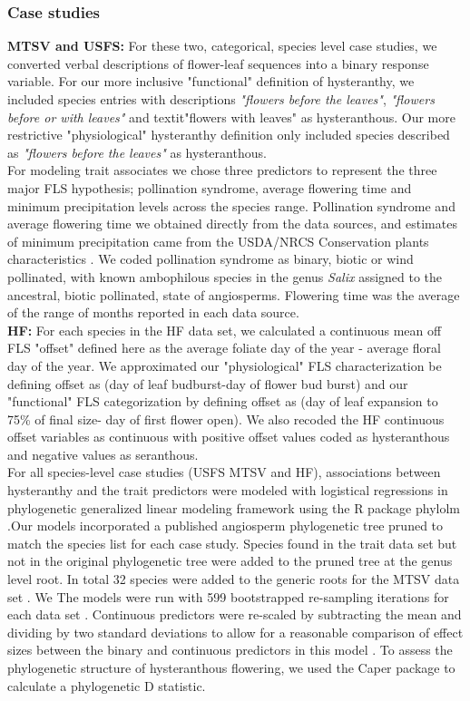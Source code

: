 \documentclass[12pt]{article}\usepackage[]{graphicx}\usepackage[]{color}
\begin{document}
\subsubsection*{Case studies}
\indent\indent \textbf{MTSV and USFS:} For these two, categorical, species level case studies, we converted verbal descriptions of flower-leaf sequences into a binary response variable. For our more inclusive "functional" definition of hysteranthy, we included species entries with descriptions \textit{"flowers before the leaves"}, \textit{"flowers before or with leaves"} and textit{"flowers with leaves"} as hysteranthous. Our more restrictive "physiological" hysteranthy definition only included species described as \textit{"flowers before the leaves"} as hysteranthous.\\
\ident For modeling trait associates we chose three predictors to represent the three major FLS hypothesis; pollination syndrome, average flowering time and minimum precipitation levels across the species range. Pollination syndrome and average flowering time we obtained directly from the data sources, and estimates of minimum precipitation came from the USDA/NRCS Conservation plants characteristics \citep{}. We coded pollination syndrome as binary, biotic or wind pollinated, with known ambophilous species in the genus \textit{Salix} assigned to the ancestral, biotic pollinated, state of angiosperms. Flowering time was the average of the range of months reported in each data source.\\
\indent \textbf{HF:} For each species in the HF data set, we calculated a continuous mean off FLS "offset" defined here as the average foliate day of the year - average floral day of the year. We approximated our "physiological" FLS characterization be defining offset as (day of leaf budburst-day of flower bud burst) and our "functional" FLS categorization by defining offset as (day of leaf expansion to 75\% of final size- day of first flower open). We also recoded the HF continuous offset variables as continuous with positive offset values coded as hysteranthous and negative values as seranthous.\\
\indent For all species-level case studies (USFS MTSV and HF), associations between hysteranthy and the trait predictors were modeled with logistical regressions in phylogenetic generalized linear modeling framework \citep{Ives2010} using the R package phylolm \citep{Ho2014}.Our models incorporated a published angiosperm phylogenetic tree \citep{Zanne2013} pruned to match the species list for each case study. Species found in the trait data set but not in the original phylogenetic tree were added to the pruned tree at the genus level root. In total 32 species were added to the generic roots for the MTSV data set . We The models were run with 599 bootstrapped re-sampling iterations for each data set \citep{Wilcox2000}. Continuous predictors were re-scaled by subtracting the mean and dividing by two standard deviations to allow for a reasonable comparison of effect sizes between the binary and continuous predictors in this model \citep{Gelman2007}. To assess the phylogenetic structure of hysteranthous flowering, we used the Caper package \citep{Orme2013} to calculate a phylogenetic D statistic.\\
\end{document}
